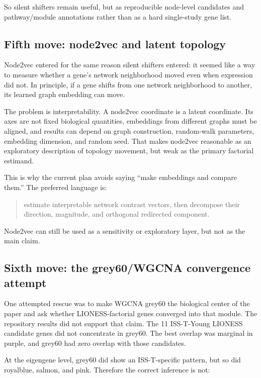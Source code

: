\documentclass[11pt]{article}
\begin{document}
So silent shifters remain useful, but as reproducible node-level candidates and
pathway/module annotations rather than as a hard single-study gene list.

\subsection{Fifth move: node2vec and latent topology}

Node2vec entered for the same reason silent shifters entered: it seemed like a
way to measure whether a gene's network neighborhood moved even when expression
did not. In principle, if a gene shifts from one network neighborhood to another,
its learned graph embedding can move.

The problem is interpretability. A node2vec coordinate is a latent coordinate.
Its axes are not fixed biological quantities, embeddings from different graphs
must be aligned, and results can depend on graph construction, random-walk
parameters, embedding dimension, and random seed. That makes node2vec reasonable
as an exploratory description of topology movement, but weak as the primary
factorial estimand.

This is why the current plan avoids saying ``make embeddings and compare them.''
The preferred language is:

\begin{quote}
estimate interpretable network contrast vectors, then decompose their direction,
magnitude, and orthogonal redirected component.
\end{quote}

Node2vec can still be used as a sensitivity or exploratory layer, but not as the
main claim.

\subsection{Sixth move: the grey60/WGCNA convergence attempt}

One attempted rescue was to make WGCNA grey60 the biological center of the paper
and ask whether LIONESS-factorial genes converged into that module. The
repository results did not support that claim. The 11 ISS-T-Young LIONESS
candidate genes did not concentrate in grey60. The best overlap was marginal in
purple, and grey60 had zero overlap with those candidates.

At the eigengene level, grey60 did show an ISS-T-specific pattern, but so did
royalblue, salmon, and pink. Therefore the correct inference is not:
\end{document}
